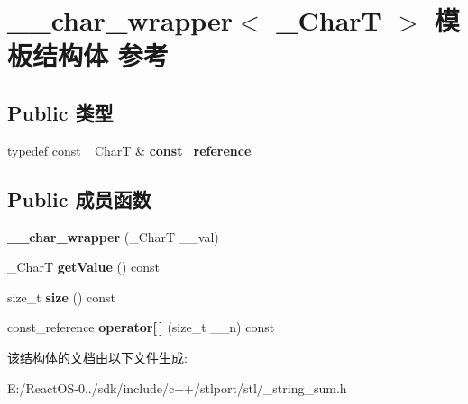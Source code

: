 \hypertarget{struct____char__wrapper}{}\section{\+\_\+\+\_\+char\+\_\+wrapper$<$ \+\_\+\+CharT $>$ 模板结构体 参考}
\label{struct____char__wrapper}
\subsection*{Public 类型}
\begin{DoxyCompactItemize}
\item 
\mbox{\label{struct____char__wrapper_a7a865ca1e6d529db5ccc898c49860fae}} 
typedef const \+\_\+\+CharT \& {\bfseries const\+\_\+reference}
\end{DoxyCompactItemize}
\subsection*{Public 成员函数}
\begin{DoxyCompactItemize}
\item 
\mbox{\label{struct____char__wrapper_afc2b430a816596405a4a5cb79d22f74d}} 
{\bfseries \+\_\+\+\_\+char\+\_\+wrapper} (\+\_\+\+CharT \+\_\+\+\_\+val)
\item 
\mbox{\label{struct____char__wrapper_afa4658ab9c454660848d31b79d9136a8}} 
\+\_\+\+CharT {\bfseries get\+Value} () const
\item 
\mbox{\label{struct____char__wrapper_a6e6c016528f0f4c709aec8df5c0be69b}} 
size\+\_\+t {\bfseries size} () const
\item 
\mbox{\label{struct____char__wrapper_ae118a00fff4278a82080dd095c4e315f}} 
const\+\_\+reference {\bfseries operator\mbox{[}$\,$\mbox{]}} (size\+\_\+t \+\_\+\+\_\+n) const
\end{DoxyCompactItemize}


该结构体的文档由以下文件生成\+:\begin{DoxyCompactItemize}
\item 
E\+:/\+React\+O\+S-\/0../sdk/include/c++/stlport/stl/\+\_\+string\+\_\+sum.\+h\end{DoxyCompactItemize}
